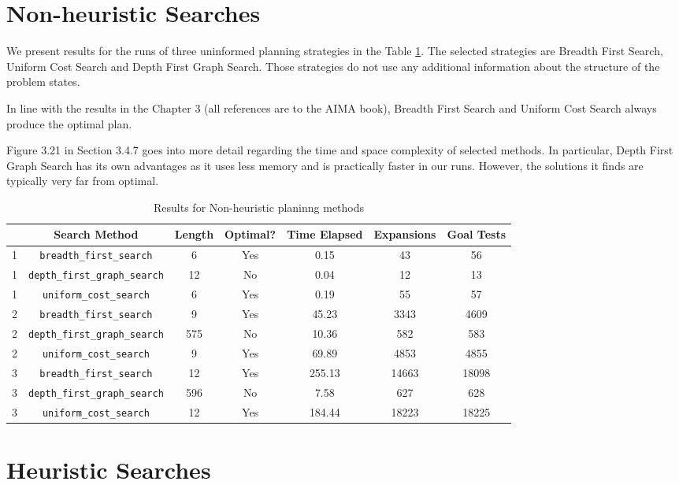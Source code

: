 \documentclass[oneside]{article}   	%
\newcommand{\bfs}{\texttt{breadth\_first\_search}}
\newcommand{\dfs}{\texttt{depth\_first\_graph\_search}}
\newcommand{\ucs}{\texttt{uniform\_cost\_search}}
\begin{document}
\section{Non-heuristic Searches}

We present results for the runs of three uninformed planning strategies in the Table \ref{NonHeuristic}. The selected strategies are Breadth First Search, Uniform Cost Search and Depth First Graph Search. Those strategies do not use any additional information about the structure of the problem states.

In line with the results in the Chapter 3 (all references are to the AIMA book), Breadth First Search and Uniform Cost Search always produce the optimal plan. 

Figure 3.21 in Section 3.4.7 goes into more detail regarding the time and space complexity of selected methods. In particular, Depth First Graph Search has its own advantages as it uses less memory and is practically faster in our runs. However, the solutions it finds are typically very far from 
optimal.

\begin{table}[ht]
\caption{Results for Non-heuristic planinng methods}
\begin{center}
\begin{tabular}{c|c|ccccc}
   & Search Method & Length & Optimal? & Time Elapsed & Expansions & Goal Tests \\
   \hline
1 & \bfs & 6 & Yes & 0.15 & 43 & 56 \\
1 & \dfs & 12 & No & 0.04 & 12 & 13 \\
1 & \ucs & 6 & Yes & 0.19 & 55 & 57 \\
   \hline
2 & \bfs & 9 & Yes & 45.23 & 3343 & 4609 \\
2 & \dfs & 575 & No & 10.36 & 582 & 583 \\
2 & \ucs & 9 & Yes & 69.89 & 4853 & 4855 \\
   \hline
3 & \bfs & 12 & Yes & 255.13 & 14663 & 18098 \\
3 & \dfs & 596 & No & 7.58 & 627 & 628 \\
3 & \ucs & 12 & Yes & 184.44 & 18223 & 18225    
\end{tabular}
\end{center}
\label{NonHeuristic}
\end{table}%


\section{Heuristic Searches}
\end{document}
